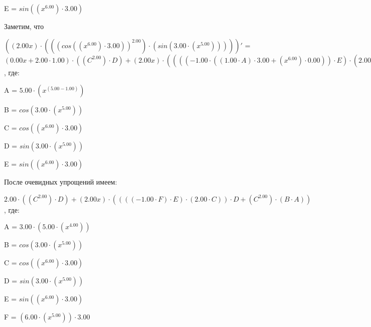 \documentclass{article}
\begin{document}
\qquad E = $sin(({x}^{6.00}) \cdot 3.00)$



\bigskip Заметим, что

$((2.00x) \cdot (({(cos(({x}^{6.00}) \cdot 3.00))}^{2.00}) \cdot (sin(3.00 \cdot ({x}^{5.00})))))'$ = $(0.00x + 2.00 \cdot 1.00) \cdot (({C}^{2.00}) \cdot D) + (2.00x) \cdot ((((-1.00 \cdot ((1.00 \cdot A) \cdot 3.00 + ({x}^{6.00}) \cdot 0.00)) \cdot E) \cdot (2.00 \cdot ({C}^{(2.00 - 1.00)}))) \cdot D + ({C}^{2.00}) \cdot (B \cdot (0.00 \cdot ({x}^{5.00}) + 3.00 \cdot (1.00 \cdot A))))$, где:

\bigskip\qquad A = $5.00 \cdot ({x}^{(5.00 - 1.00)})$

\qquad B = $cos(3.00 \cdot ({x}^{5.00}))$

\qquad C = $cos(({x}^{6.00}) \cdot 3.00)$

\qquad D = $sin(3.00 \cdot ({x}^{5.00}))$

\qquad E = $sin(({x}^{6.00}) \cdot 3.00)$



\bigskip После очевидных упрощений имеем:

$2.00 \cdot (({C}^{2.00}) \cdot D) + (2.00x) \cdot ((((-1.00 \cdot F) \cdot E) \cdot (2.00 \cdot C)) \cdot D + ({C}^{2.00}) \cdot (B \cdot A))$, где:

\bigskip\qquad A = $3.00 \cdot (5.00 \cdot ({x}^{4.00}))$

\qquad B = $cos(3.00 \cdot ({x}^{5.00}))$

\qquad C = $cos(({x}^{6.00}) \cdot 3.00)$

\qquad D = $sin(3.00 \cdot ({x}^{5.00}))$

\qquad E = $sin(({x}^{6.00}) \cdot 3.00)$

\qquad F = $(6.00 \cdot ({x}^{5.00})) \cdot 3.00$
\end{document}
